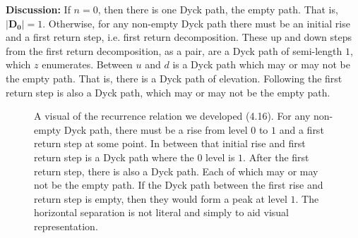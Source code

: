 \documentclass[12pt]{article}
\theoremstyle{definition}
\numberwithin{equation}{section}
\begin{document}
\textbf{Discussion:} If $n=0$, then there is one Dyck path, the empty path. That is, $|\mathbf{D_0}|=1$. Otherwise, for any non-empty Dyck path there must be an initial rise and a first return step, i.e. first return decomposition. These up and down steps from the first return decomposition, as a pair, are a Dyck path of semi-length $1$, which $z$ enumerates. Between $u$ and $d$ is a Dyck path which may or may not be the empty path. That is, there is a Dyck path of elevation. Following the first return step is also a Dyck path, which may or may not be the empty path.

\begin{figure}[ht]
  \centering
  \caption{A visual of the recurrence relation we developed (4.16). For any non-empty Dyck path, there must be a rise from level $0$ to $1$ and a first return step at some point. In between that initial rise and first return step is a Dyck path where the $0$ level is $1$. After the first return step, there is also a Dyck path. Each of which may or may not be the empty path. If the Dyck path between the first rise and return step is empty, then they would form a peak at level $1$. The horizontal separation is not literal and simply to aid visual representation.}
  \label{figure:solving-CVP-bad-basis}
\end{figure}
\end{document}

